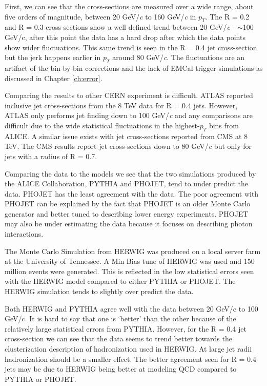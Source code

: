 First, we can see that the cross-sections are measured over a wide range, about five orders of magnitude, between 20 GeV/\textit{c} to 160 GeV/\textit{c} in $p_{T}$. The R = 0.2 and R = 0.3 cross-sections show a well defined trend between 20 GeV/\textit{c} - $\sim$100 GeV/c, after this point the data  has a hard drop after which the data points show wider fluctuations.  This same trend is seen in the R = 0.4 jet cross-section but the jerk happens earlier in $p_{T}$ around  80 GeV/\textit{c}.  The fluctuations are an artifact of the bin-by-bin corrections and the lack of EMCal trigger simulations as discussed in Chapter \ref{ch:error}.  

Comparing the results to other CERN experiment is difficult.  ATLAS reported inclusive jet cross-sections from the 8 TeV data for R = 0.4 jets\cite{Aaboud:2017dvo}.  However, ATLAS only performs jet finding down to 100 GeV/\textit{c} and any comparisons are difficult due to the wide statistical fluctuations in the highest-$p_{T}$ bins from ALICE.  A similar issue exists with jet cross-sections reported from CMS at 8 TeV\cite{CMS:2013kda}.  The CMS results report jet cross-sections down to 80 GeV/\textit{c} but only for jets with a radius of R = 0.7.  

Comparing the data to the models we see that the two simulations produced by the ALICE Collaboration, PYTHIA and PHOJET, tend to under predict the data.  PHOJET has the least agreement with the data.  The poor agreement with PHOJET can be explained by the fact that PHOJET is an older Monte Carlo generator and better tuned to describing lower energy experiments.  PHOJET may also be under estimating the data because it focuses on describing photon interactions.  

The Monte Carlo Simulation from HERWIG was produced on a local server farm at the University of Tennessee.  A Min Bias tune of HERWIG was used and 150 million events were generated.  This is reflected in the low statistical errors seen with the HERWIG model compared to either PYTHIA or PHOJET.  The HERWIG simulation tends to slightly over predict the data. 

 Both HERWIG and PYTHIA agree well with the data between 20 GeV/c to 100 GeV/c.  It is hard to say that one is `better' than the other because of the relatively large statistical errors from PYTHIA.  However, for the R = 0.4 jet cross-section we can see that the data seems to trend better towards the clusterization description of hadronization used in HERWIG.  At large jet radii hadronization should be a smaller effect.  The better agreement seen for R = 0.4 jets may be due to HERWIG being better at modeling QCD compared to PYTHIA or PHOJET.

